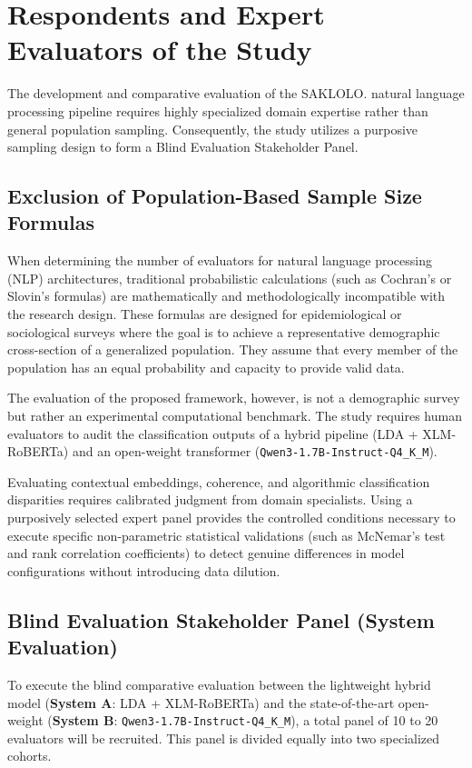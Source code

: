 \documentclass[12pt,a4paper]{report}
\newcommand{\sysA}{\textbf{System A}}
\newcommand{\sysB}{\textbf{System B}}
\newcommand{\qwen}{\texttt{Qwen3-1.7B-Instruct-Q4\_K\_M}}
\newcommand{\xlmr}{XLM-RoBERTa}
\begin{document}
\section{Respondents and Expert Evaluators of the Study}

The development and comparative evaluation of the SAKLOLO. natural language
processing pipeline requires highly specialized domain expertise rather than
general population sampling. Consequently, the study utilizes a purposive
sampling design to form a Blind Evaluation Stakeholder Panel.

\subsection{Exclusion of Population-Based Sample Size Formulas}

When determining the number of evaluators for natural language processing (NLP)
architectures, traditional probabilistic calculations (such as Cochran's or
Slovin's formulas) are mathematically and methodologically incompatible with
the research design. These formulas are designed for epidemiological or
sociological surveys where the goal is to achieve a representative demographic
cross-section of a generalized population. They assume that every member of the
population has an equal probability and capacity to provide valid data.

The evaluation of the proposed framework, however, is not a demographic survey
but rather an experimental computational benchmark. The study requires human
evaluators to audit the classification outputs of a hybrid pipeline
(LDA + \xlmr) and an open-weight transformer (\qwen).

Evaluating contextual embeddings, coherence, and algorithmic classification
disparities requires calibrated judgment from domain specialists. Using a
purposively selected expert panel provides the controlled conditions necessary
to execute specific non-parametric statistical validations (such as McNemar's
test and rank correlation coefficients) to detect genuine differences in model
configurations without introducing data dilution.

\subsection{Blind Evaluation Stakeholder Panel (System Evaluation)}

To execute the blind comparative evaluation between the lightweight hybrid model
(\sysA: LDA + \xlmr) and the state-of-the-art open-weight
(\sysB: \qwen), a total panel of 10 to 20 evaluators will be recruited. This panel is
divided equally into two specialized cohorts.
\end{document}
